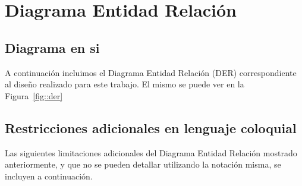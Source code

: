 \section{Diagrama Entidad Relaci\'on}

\subsection{Diagrama en si}

A continuaci\'on incluimos el Diagrama Entidad Relaci\'on (DER) correspondiente
al dise\~no realizado para este trabajo. El mismo se puede ver en la Figura~\ref{fig::der}

\subsection{Restricciones adicionales en lenguaje coloquial}

Las siguientes limitaciones adicionales del Diagrama Entidad Relaci\'on mostrado anteriormente,
y que no se pueden detallar utilizando la notaci\'on misma, se incluyen a continuaci\'on.

